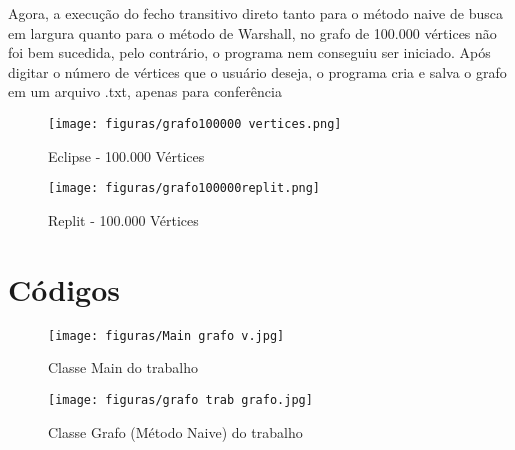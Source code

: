 \vspace{\baselineskip}

Agora, a execução do fecho transitivo direto tanto para o método naive de busca em largura quanto para o método de Warshall, no grafo de 100.000 vértices não foi bem sucedida, pelo contrário, o programa nem conseguiu ser iniciado. Após digitar o número de vértices que o usuário deseja, o programa cria e salva o grafo em um arquivo .txt, apenas para conferência 


\begin{figure}[H]
  \centering
  \begin{minipage}[t]{0.48\textwidth}
    \centering
    \texttt{[image: figuras/grafo100000 vertices.png]}
	\caption[\hspace{0.1cm}Eclipse Naive100v]{Eclipse - 100.000 Vértices}
  \end{minipage}
  \hfill
  \begin{minipage}[t]{0.48\textwidth}
    \centering
    \texttt{[image: figuras/grafo100000replit.png]}
	\caption[\hspace{0.1cm}Eclipse Warshall100v]{Replit - 100.000 Vértices}
  \end{minipage}
\end{figure}
\vspace{\baselineskip}
\vspace{\baselineskip}
\vspace{\baselineskip}
\vspace{\baselineskip}

\section{\esp Códigos}

\begin{figure}[!ht]
	\centering	
	\caption[\hspace{0.1cm}Exemplo de tela de software.]{Classe Main do trabalho}
	  \vspace{-0.4cm}
	\texttt{[image: figuras/Main grafo v.jpg]}
\end{figure}

\begin{figure}[!ht]
	\centering	
	\caption[\hspace{0.1cm}Exemplo de tela de software.]{Classe Grafo (Método Naive) do trabalho}
	  \vspace{-0.4cm}
	\texttt{[image: figuras/grafo trab grafo.jpg]}
\end{figure}

